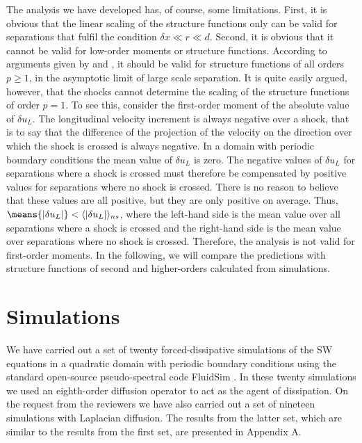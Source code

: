 The analysis we have developed has, of course, some limitations. First, it is obvious that  the linear scaling of the structure functions only can be valid for separations  that fulfil the condition $ \delta x \ll r \ll d $.  Second, it is obvious that it  cannot be valid for low-order moments or structure functions. According to arguments given by  \cite{BouchaudMezardParisi1995}  and \cite{Weinan}, it should be valid for structure functions of all orders $ p  \ge 1 $, in the asymptotic limit of large scale separation.  It is quite easily argued, however, that the shocks cannot determine the scaling of the structure functions of order $ p=1 $.
To see this, consider the first-order moment of the absolute value of $ \delta u_L $.
The longitudinal velocity increment is always negative over a shock, that is to say that the difference of the projection of the velocity on the direction over which the shock is crossed is always negative. In a domain with periodic boundary conditions the mean value of $ \delta u_L $   is zero. The negative values of $ \delta u_L $ for separations where a shock is crossed must therefore be compensated by positive values for separations where no shock is crossed. There is no reason to believe that these values are all positive,  but they are only positive on average. Thus,
$ \means{ |\delta u_L | } < \langle | \delta u_L | \rangle _{ns} $, where the left-hand side is the mean value over all separations where a shock is crossed and the right-hand side is the mean value over separations where no shock is crossed.  Therefore, the analysis is not valid for first-order moments. In the following, we will compare the predictions with structure functions of second and higher-orders calculated from simulations.









\section{Simulations}

We have carried out a set of twenty forced-dissipative simulations of the SW
equations in a quadratic domain with periodic boundary conditions using the
standard open-source pseudo-spectral code FluidSim \citep[]{fluiddyn, fluidfft,
fluidsim}. In these twenty simulations we used an eighth-order diffusion operator to act as the agent of dissipation.
 On the request from the reviewers we have also carried out a set of nineteen simulations with  Laplacian diffusion. The results from the latter set, which are similar to the results from the first set,  are presented in Appendix A.

